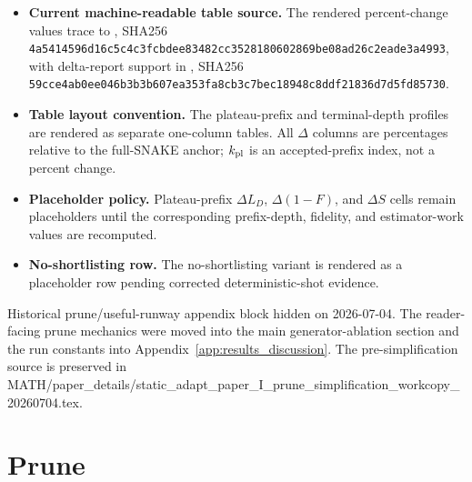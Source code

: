 \documentclass[
  reprint,
  amsmath,
  amssymb,
  aps,
  pra,
  nofootinbib,
  superscriptaddress,
  floatfix
]{revtex4-2}
\begin{document}
\begin{itemize}
\item \textbf{Current machine-readable table source.} The rendered percent-change values trace to , SHA256 \texttt{4a5414596d16c5c4c3fcbdee83482cc3528180602869be08ad26c2eade3a4993}, with delta-report support in , SHA256 \texttt{59cce4ab0ee046b3b3b607ea353fa8cb3c7bec18948c8ddf21836d7d5fd85730}.
\item \textbf{Table layout convention.} The plateau-prefix and terminal-depth profiles are rendered as separate one-column tables. All \(\Delta\) columns are percentages relative to the full-SNAKE anchor; \(k_{\rm pl}\) is an accepted-prefix index, not a percent change.
\item \textbf{Placeholder policy.} Plateau-prefix \(\Delta L_D\), \(\Delta(1-F)\), and \(\Delta S\) cells remain placeholders until the corresponding prefix-depth, fidelity, and estimator-work values are recomputed.
\item \textbf{No-shortlisting row.} The no-shortlisting variant is rendered as a placeholder row pending corrected deterministic-shot evidence.
\end{itemize}

\fi

\iffalse
Historical prune/useful-runway appendix block hidden on 2026-07-04.  The
reader-facing prune mechanics were moved into the main generator-ablation
section and the run constants into Appendix~\ref{app:results_discussion}.
The pre-simplification source is preserved in
MATH/paper_details/static_adapt_paper_I_prune_simplification_workcopy_20260704.tex.

\section{Prune}
\label{app:prune}
\end{document}
